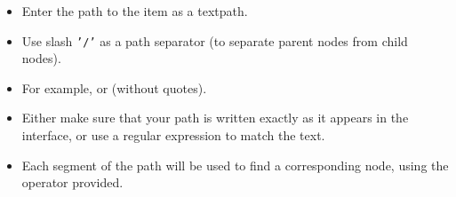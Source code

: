 \begin{itemize}
\item Enter the path to the item as a textpath.
\item Use slash {\tt '/'} as a path separator (to separate parent nodes from child nodes).
\item For example,   or  (without quotes). 
\item Either make sure that your path is written exactly as it appears in the interface, or use a regular expression to match the text.
\item Each segment of the path will be used to find a corresponding node, using the operator provided.
  \end{itemize}
